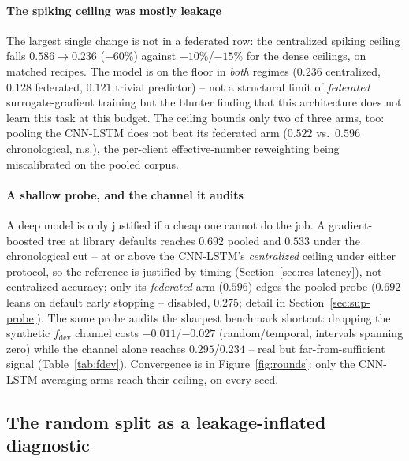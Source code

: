 \paragraph{The spiking ceiling was mostly leakage}
The largest single change is not in a federated row: the centralized
spiking ceiling falls $0.586 \rightarrow 0.236$ ($-60\%$) against
$-10\%$/$-15\%$ for the dense ceilings, on matched recipes. The model is
on the floor in \emph{both} regimes ($0.236$ centralized, $0.128$
federated, $0.121$ trivial predictor) -- not a structural limit of
\emph{federated} surrogate-gradient training but the blunter finding
that this architecture does not learn this task at this budget. The
ceiling bounds only two of three arms, too: pooling the CNN-LSTM does
not beat its federated arm ($0.522$ vs.\ $0.596$ chronological, n.s.),
the per-client effective-number reweighting \cite{cui2019} being
miscalibrated on the pooled corpus.

\paragraph{A shallow probe, and the channel it audits}
A deep model is only justified if a cheap one cannot do the job. A
gradient-boosted tree at library defaults reaches \macroF{} $0.692$
pooled and $0.533$ under the chronological cut -- at or above the
CNN-LSTM's \emph{centralized} ceiling under either protocol, so the
reference is justified by timing (Section~\ref{sec:res-latency}), not
centralized accuracy; only its \emph{federated} arm ($0.596$) edges the
pooled probe ($0.692$ leans on default early stopping -- disabled,
$0.275$; detail in Section~\ref{sec:sup-probe}). The same probe audits
the sharpest benchmark shortcut: dropping the synthetic
$f_{\mathrm{dev}}$ channel costs $-0.011$/$-0.027$ \macroF{}
(random/temporal, intervals spanning zero) while the channel alone
reaches $0.295$/$0.234$ -- real but far-from-sufficient signal
(Table~\ref{tab:fdev}). Convergence is in Figure~\ref{fig:rounds}: only
the CNN-LSTM averaging arms reach their ceiling, on every seed.

\subsection{The random split as a leakage-inflated diagnostic}
\label{sec:res-temporal}

